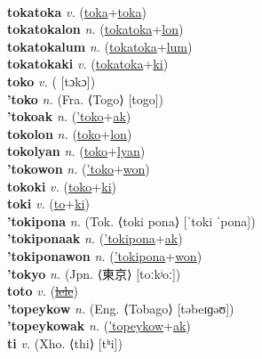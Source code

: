  \label{tokaki} \\
\textbf{tokatoka} \textit{v.} (\hyperref[toka]{toka}+\hyperref[toka]{toka})
 \label{tokatoka} \\
\textbf{tokatokalon} \textit{n.} (\hyperref[tokatoka]{tokatoka}+\hyperref[lon]{lon})
 \label{tokatokalon} \\
\textbf{tokatokalum} \textit{n.} (\hyperref[tokatoka]{tokatoka}+\hyperref[lum]{lum})
 \label{tokatokalum} \\
\textbf{tokatokaki} \textit{v.} (\hyperref[tokatoka]{tokatoka}+\hyperref[ki]{ki})
 \label{tokatokaki} \\
\textbf{toko} \textit{v.} ( [tɔkɔ])
 \label{toko} \\
\textbf{'toko} \textit{n.} (Fra. ⟨Togo⟩ [togo])
 \label{'toko} \\
\textbf{'tokoak} \textit{n.} (\hyperref['toko]{'toko}+\hyperref[ak]{ak})
 \label{'tokoak} \\
\textbf{tokolon} \textit{n.} (\hyperref[toko]{toko}+\hyperref[lon]{lon})
 \label{tokolon} \\
\textbf{tokolyan} \textit{n.} (\hyperref[toko]{toko}+\hyperref[lyan]{lyan})
 \label{tokolyan} \\
\textbf{'tokowon} \textit{n.} (\hyperref['toko]{'toko}+\hyperref[won]{won})
 \label{'tokowon} \\
\textbf{tokoki} \textit{v.} (\hyperref[toko]{toko}+\hyperref[ki]{ki})
 \label{tokoki} \\
\textbf{toki} \textit{v.} (\hyperref[to]{to}+\hyperref[ki]{ki})
 \label{toki} \\
\textbf{'tokipona} \textit{n.} (Tok. ⟨toki pona⟩ [ˈtoki ˈpona])
 \label{'tokipona} \\
\textbf{'tokiponaak} \textit{n.} (\hyperref['tokipona]{'tokipona}+\hyperref[ak]{ak})
 \label{'tokiponaak} \\
\textbf{'tokiponawon} \textit{n.} (\hyperref['tokipona]{'tokipona}+\hyperref[won]{won})
 \label{'tokiponawon} \\
\textbf{'tokyo} \textit{n.} (Jpn. ⟨東京⟩ [toːkʲoː])
 \label{'tokyo} \\
\textbf{toto} \textit{v.} (\hyperref[lele]{\sout{lele}})
 \label{toto} \\
\textbf{'topeykow} \textit{n.} (Eng. ⟨Tobago⟩ [təbeɪɡəʊ])
 \label{'topeykow} \\
\textbf{'topeykowak} \textit{n.} (\hyperref['topeykow]{'topeykow}+\hyperref[ak]{ak})
 \label{'topeykowak} \\
\textbf{ti} \textit{v.} (Xho. ⟨thi⟩ [tʰi])
